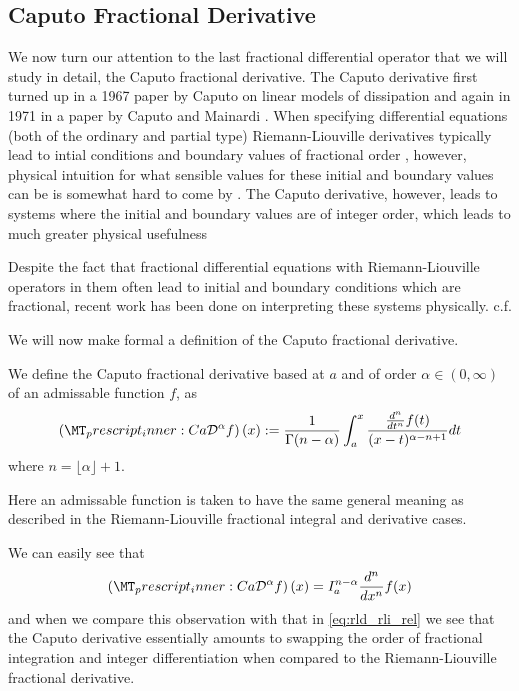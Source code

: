 \subsection{Caputo Fractional Derivative}
We now turn our attention to the last fractional differential operator that we will study in detail, the Caputo fractional derivative. 
The Caputo derivative first turned up in a 1967 paper by Caputo on linear models of dissipation \cite{Caputo1967} and again in 1971 in a paper by Caputo and Mainardi \cite{Caputo1971}.  When specifying differential equations (both of the ordinary and partial type) Riemann-Liouville derivatives typically lead to intial conditions and boundary values of fractional order \cite{Caputo1971, Podlubny1999, Samko1993, Heymans2005}, however, physical intuition for what sensible values for these initial and boundary values can be is somewhat hard to come by \cite{Caputo1971, Podlubny1999, Samko1993, Gorenflo1997}. The Caputo derivative, however, leads to systems where the initial and boundary values are of integer order, which leads to much greater physical usefulness \cite{Podlubny1999, Samko1993, Gorenflo1997}

Despite the fact that fractional differential equations with Riemann-Liouville operators in them often lead to initial and boundary conditions which are fractional, recent work has been done on interpreting these systems physically. c.f. \cite{Heymans2005}

We will now make formal a definition of the Caputo fractional derivative.
\begin{definition}
    We define the Caputo fractional derivative based at $ a $ and of order $\alpha \in (0, \infty) $ of an admissable function $ f $, as
    \begin{align*}
        \capder{a}{}{\alpha}{f}(x)      := \frac{1}{\Gamma(n - \alpha)} \int_a^x \frac{\frac{d^n}{dt^n}f(t)}{(x-t)^{\alpha -n + 1}} dt
    \end{align*}
    where $ n = \lfloor \alpha \rfloor + 1 $.
\end{definition}
Here an admissable function is taken to have the same general meaning as described in the Riemann-Liouville fractional integral and derivative cases.

We can easily see that
\begin{align}
    \label{eq:cap_rli_rel}
    \capder{a}{}{\alpha}{f}(x) = I_a^{n-\alpha} \frac{d^n}{dx^n} f(x)
\end{align}
and when we compare this observation with that in \eqref{eq:rld_rli_rel} we see that the Caputo derivative essentially amounts to swapping the order of fractional integration and integer differentiation when compared to the Riemann-Liouville fractional derivative.

